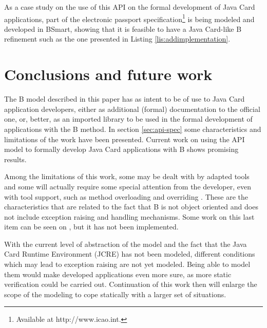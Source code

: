 \documentclass{llncs}
\begin{document}
As a case study on the use of this API on the formal development of Java Card applications, part of the electronic passport specification\footnote{Available at http://www.icao.int.} is being modeled and developed in BSmart, showing that it is feasible to have a Java Card-like B refinement  such as the one presented in Listing \ref{lis:addimplementation}.

\section{Conclusions and future work}\label{sec:conc}

The B model described in this paper has as intent to be of use to Java Card application developers, either as additional (formal) documentation to the official one, or, better, as an imported library to be used in the formal development of applications with the B method. In section \ref{sec:api-spec} some characteristics and limitations of the work have been presented. Current work on using the API model to formally develop Java Card applications with B shows promising results. 

Among the limitations of this work, some may be dealt with by adapted tools and some will actually require some special attention from the developer, even with tool support, such as method overloading and overriding . These are the characteristics that are related to the fact that B is not object oriented and does not include exception raising and handling mechanisms. Some work on this last item can be seen on \cite{BR2003}, but it has not been implemented.

With the current level of abstraction of the model and the fact that the Java Card Runtime Environment (JCRE) has not been modeled, different conditions which may lead to exception raising are not yet modeled. Being able to model them would make developed applications even more sure, as more static verification could be carried
out. Continuation of this work then will enlarge the scope of the modeling to cope statically with a larger set of situations.




\end{document}
